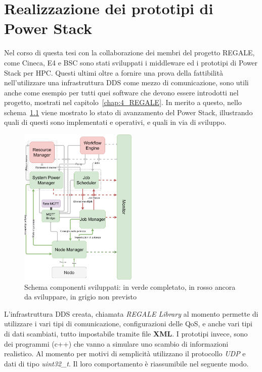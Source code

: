 \chapter{Realizzazione dei prototipi di Power Stack}
Nel corso di questa tesi con la collaborazione dei membri del progetto REGALE, come Cineca\cite{Cineca}, E4\cite{E4} e BSC\cite{BSC} sono stati sviluppati i middleware ed i prototipi di Power Stack per HPC. 
Questi ultimi oltre a fornire una prova della fattibilità nell'utilizzare una infrastruttura DDS come mezzo di comunicazione, sono utili anche come esempio per tutti quei software che devono essere introdotti nel progetto, mostrati nel capitolo~\ref{chap:4_REGALE}.
In merito a questo, nello schema~\ref{fig:schema_global_dummy_implementati} viene mostrato lo stato di avanzamento del Power Stack, illustrando quali di questi sono implementati e operativi, e quali in via di sviluppo.

\begin{figure}[H]
    \centering
    \includegraphics[width=0.50\textwidth]{./img/SchemaPowerStack_perdummy.drawio.png}
    \caption{Schema componenti sviluppati: in verde completato, in rosso ancora da sviluppare, in grigio non previsto}
    \label{fig:schema_global_dummy_implementati}
\end{figure}
L'infrastruttura DDS creata, chiamata \emph{REGALE Library}\cite{RegaleLibrary} al momento permette di utilizzare i vari tipi di comunicazione, configurazioni delle QoS, e anche vari tipi di dati scambiati, tutto impostabile tramite file \textbf{XML}.
I prototipi invece, sono dei programmi (c++) che vanno a simulare uno scambio di informazioni realistico. Al momento per motivi di semplicità utilizzano il protocollo \emph{UDP} e dati di tipo \emph{uint32\_t}. Il loro comportamento è riassumibile nel seguente modo.

